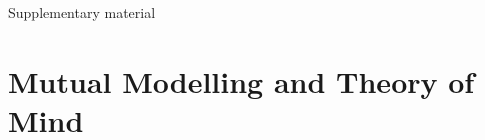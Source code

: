\documentclass[compress]{beamer}
\begin{document}
\appendix

\begin{frame}{Supplementary material}
    \begin{multicols}{2}
    \tableofcontents[hideallsubsections]
    \end{multicols}
\end{frame}




\section{Mutual Modelling and Theory of Mind}
\end{document}
